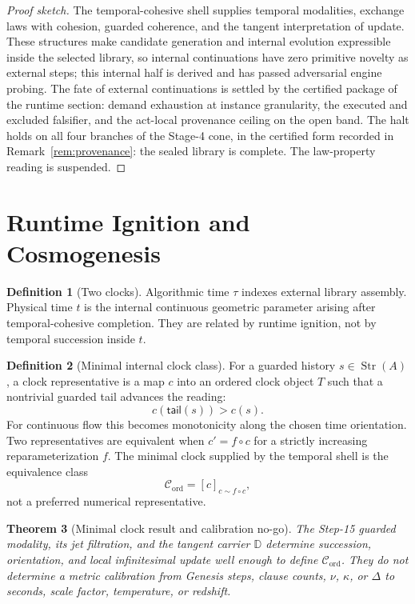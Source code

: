 \documentclass[11pt]{article}
\theoremstyle{plain}
\newtheorem{theorem}{Theorem}[section]
\theoremstyle{definition}
\newtheorem{definition}[theorem]{Definition}
\theoremstyle{remark}
\newenvironment{proofsketch}{\begin{proof}[Proof sketch]}{\end{proof}}
\newcommand{\Str}{\operatorname{Str}}
\newcommand{\D}{\mathbb{D}}
\begin{document}
\begin{proofsketch}
The temporal-cohesive shell supplies temporal modalities, exchange laws with cohesion, guarded coherence, and the tangent interpretation of update. These structures make candidate generation and internal evolution expressible inside the selected library, so internal continuations have zero primitive novelty as external steps; this internal half is derived and has passed adversarial engine probing. The fate of external continuations is settled by the certified package of the runtime section: demand exhaustion at instance granularity, the executed and excluded falsifier, and the act-local provenance ceiling on the open band. The halt holds on all four branches of the Stage-4 cone, in the certified form recorded in Remark~\ref{rem:provenance}: the sealed library is complete. The law-property reading is suspended.
\end{proofsketch}

\section{Runtime Ignition and Cosmogenesis}

\begin{definition}[Two clocks]
Algorithmic time \(\tau\) indexes external library assembly. Physical time \(t\) is the internal continuous geometric parameter arising after temporal-cohesive completion. They are related by runtime ignition, not by temporal succession inside \(t\).
\end{definition}

\begin{definition}[Minimal internal clock class]
For a guarded history \(s\in\Str(A)\), a clock representative is a map \(c\) into an ordered clock object \(T\) such that a nontrivial guarded tail advances the reading:
\[
c(\mathsf{tail}(s))>c(s).
\]
For continuous flow this becomes monotonicity along the chosen time orientation. Two representatives are equivalent when \(c' = f\circ c\) for a strictly increasing reparameterization \(f\). The minimal clock supplied by the temporal shell is the equivalence class
\[
\mathcal{C}_{\mathrm{ord}}=[c]_{c\sim f\circ c},
\]
not a preferred numerical representative.
\end{definition}

\begin{theorem}[Minimal clock result and calibration no-go]
The Step-15 guarded modality, its jet filtration, and the tangent carrier \(\D\) determine succession, orientation, and local infinitesimal update well enough to define \(\mathcal{C}_{\mathrm{ord}}\). They do not determine a metric calibration from Genesis steps, clause counts, \(\nu\), \(\kappa\), or \(\Delta\) to seconds, scale factor, temperature, or redshift.
\end{theorem}
\end{document}
